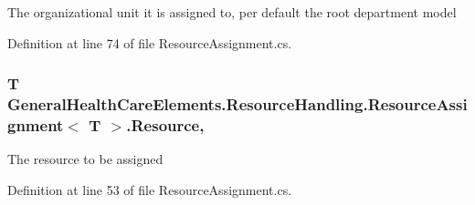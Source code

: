 The organizational unit it is assigned to, per default the root department model 



Definition at line 74 of file Resource\+Assignment.\+cs.

\subsubsection[{\texorpdfstring{Resource}{Resource}}]{\setlength{\rightskip}{0pt plus 5cm}T {\bf General\+Health\+Care\+Elements.\+Resource\+Handling.\+Resource\+Assignment}$<$ T $>$.Resource\hspace{0.3cm}{\ttfamily [get]}, {\ttfamily [set]}}\hypertarget{class_general_health_care_elements_1_1_resource_handling_1_1_resource_assignment_a27eb51cd5c904969fb7f307a72b0bb4c}{}\label{class_general_health_care_elements_1_1_resource_handling_1_1_resource_assignment_a27eb51cd5c904969fb7f307a72b0bb4c}


The resource to be assigned 



Definition at line 53 of file Resource\+Assignment.\+cs.

